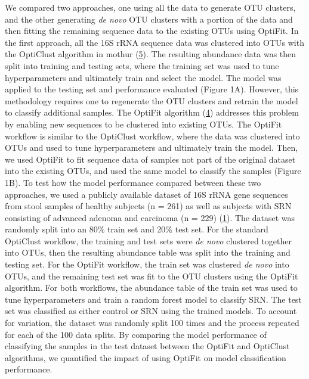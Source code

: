 \documentclass[
]{article}
\begin{document}
We compared two approaches, one using all the data to generate OTU
clusters, and the other generating \emph{de novo} OTU clusters with a
portion of the data and then fitting the remaining sequence data to the
existing OTUs using OptiFit. In the first approach, all the 16S rRNA
sequence data was clustered into OTUs with the OptiClust algorithm in
mothur (\protect\hyperlink{ref-westcott2017}{5}). The resulting
abundance data was then split into training and testing sets, where the
training set was used to tune hyperparameters and ultimately train and
select the model. The model was applied to the testing set and
performance evaluated (Figure 1A). However, this methodology requires
one to regenerate the OTU clusters and retrain the model to classify
additional samples. The OptiFit algorithm
(\protect\hyperlink{ref-sovacool2022}{4}) addresses this problem by
enabling new sequences to be clustered into existing OTUs. The OptiFit
workflow is similar to the OptiClust workflow, where the data was
clustered into OTUs and used to tune hyperparameters and ultimately
train the model. Then, we used OptiFit to fit sequence data of samples
not part of the original dataset into the existing OTUs, and used the
same model to classify the samples (Figure 1B). To test how the model
performance compared between these two approaches, we used a publicly
available dataset of 16S rRNA gene sequences from stool samples of
healthy subjects (n = 261) as well as subjects with SRN consisting of
advanced adenoma and carcinoma (n = 229)
(\protect\hyperlink{ref-baxter2016}{1}). The dataset was randomly split
into an 80\% train set and 20\% test set. For the standard OptiClust
workflow, the training and test sets were \emph{de novo} clustered
together into OTUs, then the resulting abundance table was split into
the training and testing set. For the OptiFit workflow, the train set
was clustered \emph{de novo} into OTUs, and the remaining test set was
fit to the OTU clusters using the OptiFit algorithm. For both workflows,
the abundance table of the train set was used to tune hyperparameters
and train a random forest model to classify SRN. The test set was
classified as either control or SRN using the trained models. To account
for variation, the dataset was randomly split 100 times and the process
repeated for each of the 100 data splits. By comparing the model
performance of classifying the samples in the test dataset between the
OptiFit and OptiClust algorithms, we quantified the impact of using
OptiFit on model classification performance.
\end{document}
